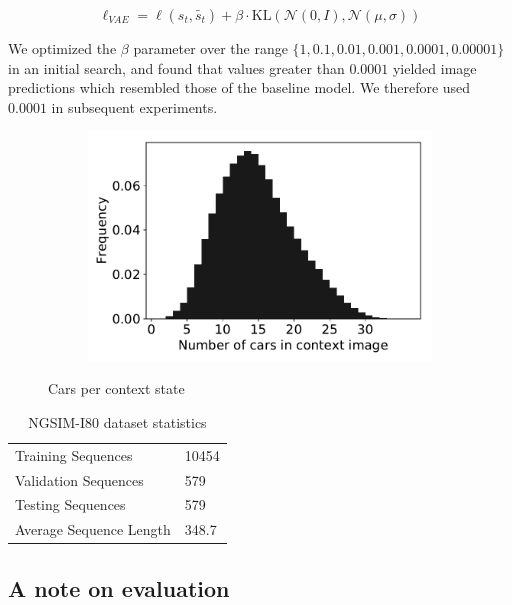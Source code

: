 \documentclass{article}
\begin{document}
\begin{equation}
\ell_{VAE} = \ell(s_t, \tilde{s_t}) + \beta \cdot \mbox{KL}(\mathcal{N}(0, I), \mathcal{N}(\mu, \sigma))
\end{equation}

We optimized the $\beta$ parameter over the range $\{1, 0.1, 0.01, 0.001, 0.0001, 0.00001 \}$ in an initial search, and found that values greater than $0.0001$ yielded image predictions which resembled those of the baseline model.
We therefore used $0.0001$ in subsequent experiments.


\begin{figure}
  \centering
  \begin{subfigure}[b]{0.5\textwidth}
    \includegraphics[width=\textwidth]{images/car_statistics.pdf}
  \end{subfigure}
  \caption{Cars per context state}
  \label{car-statistics}
\end{figure}


\begin{table}
  \caption{NGSIM-I80 dataset statistics}
  \label{i80-stats}
  \centering
  \begin{tabular}{ll}
    \toprule
    Training Sequences     & 10454 \\
    Validation Sequences & 579 \\
    Testing Sequences & 579 \\
    Average Sequence Length & 348.7 \\
    \bottomrule
  \end{tabular}
\end{table}



\subsection{A note on evaluation}
\end{document}
